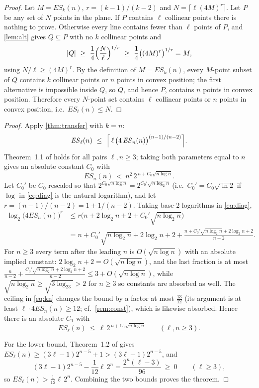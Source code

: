 \documentclass[11pt,a4paper]{article}
\theoremstyle{plain}
\theoremstyle{definition}
\theoremstyle{remark}
\newcommand{\ES}{\mathit{ES}}
\begin{document}
\label{pf:transfer}
\thmtransfer*
\begin{proof}
Let $M=\ES_k(n)$, $r=(k-1)/(k-2)$ and $N=\lceil\ell(4M)^r\rceil$. Let $P$ be any set of $N$ points in the plane. If $P$ contains $\ell$ collinear points there is nothing to prove. Otherwise every line contains fewer than $\ell$ points of $P$, and \cref{lem:alt} gives $Q\subseteq P$ with no $k$ collinear points and
\[
 |Q|\ \ge\ \frac14\Bigl(\frac N\ell\Bigr)^{1/r}\ \ge\ \frac14\bigl((4M)^r\bigr)^{1/r}=M,
\]
using $N/\ell\ge(4M)^r$. By the definition of $M=\ES_k(n)$, every $M$-point subset of $Q$ contains $k$ collinear points or $n$ points in convex position; the first alternative is impossible inside $Q$, so $Q$, and hence $P$, contains $n$ points in convex position. Therefore every $N$-point set contains $\ell$ collinear points or $n$ points in convex position, i.e.\ $\ES_\ell(n)\le N$.
\end{proof}

\label{pf:main}
\thmmain*
\begin{proof}
Apply \cref{thm:transfer} with $k=n$:
\begin{equation}\label{eq:kn}
 \ES_\ell(n)\ \le\ \Bigl\lceil\,\ell\,\bigl(4\,\ES_n(n)\bigr)^{(n-1)/(n-2)}\Bigr\rceil .
\end{equation}
Theorem~1.1 of \cite{CFHMSV} holds for all pairs $\ell,n\ge3$; taking both parameters equal to $n$ gives an absolute constant $C_0$ with
\begin{equation}\label{eq:diag}
 \ES_n(n)\ <\ n^2\,2^{\,n+C_0\sqrt{n\log n}} .
\end{equation}
Let $C_0'$ be $C_0$ rescaled so that $2^{C_0\sqrt{n\log n}}=2^{C_0'\sqrt{n\log_2 n}}$ (i.e.\ $C_0'=C_0\sqrt{\ln 2}$ if $\log$ in \eqref{eq:diag} is the natural logarithm), and let $r=(n-1)/(n-2)=1+1/(n-2)$. Taking base-$2$ logarithms in \eqref{eq:diag},
\begin{align*}
 \log_2\bigl(4\ES_n(n)\bigr)^r
 &\le r\bigl(n+2\log_2n+2+C_0'\sqrt{n\log_2n}\bigr)\\
 &= n+C_0'\sqrt{n\log_2n}+2\log_2n+2+\frac{n+C_0'\sqrt{n\log_2n}+2\log_2n+2}{n-2}.
\end{align*}
For $n\ge3$ every term after the leading $n$ is $O(\sqrt{n\log n})$ with an absolute implied constant: $2\log_2n+2=O(\sqrt{n\log n})$, and the last fraction is at most $\frac{n}{n-2}+\frac{C_0'\sqrt{n\log_2 n}+2\log_2n+2}{n-2}\le 3+O(\sqrt{n\log n})$, while $\sqrt{n\log_2n}\ge\sqrt{3\log_23}>2$ for $n\ge3$ so constants are absorbed as well. The ceiling in \eqref{eq:kn} changes the bound by a factor at most $\frac{13}{12}$ (its argument is at least $\ell\cdot4\ES_n(n)\ge12$; cf.\ \cref{rem:const}), which is likewise absorbed. Hence there is an absolute $C_1$ with
\[
 \ES_\ell(n)\ \le\ \ell\,2^{\,n+C_1\sqrt{n\log n}}\qquad(\ell,n\ge3).
\]

For the lower bound, Theorem~1.2 of \cite{CFHMSV} gives $\ES_\ell(n)\ge(3\ell-1)2^{n-5}+1>(3\ell-1)2^{n-5}$, and
\[
 (3\ell-1)2^{n-5}-\frac1{12}\ell\,2^n=\frac{2^n(\ell-3)}{96}\ \ge\ 0\qquad(\ell\ge3),
\]
so $\ES_\ell(n)>\frac1{12}\ell\,2^n$. Combining the two bounds proves the theorem.
\end{proof}
\end{document}

